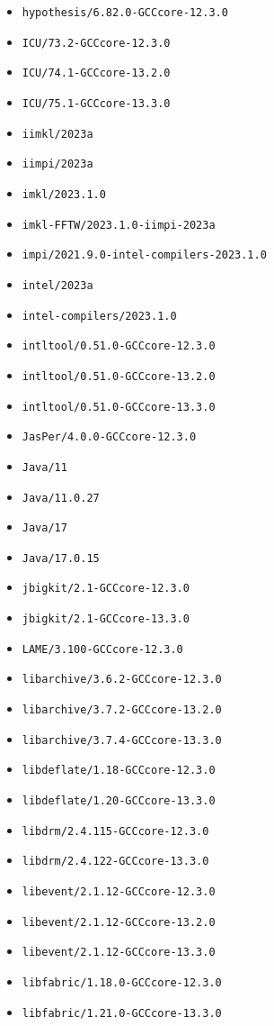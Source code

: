 \begin{multicols}{3}
\begin{itemize}
\item \verb|hypothesis/6.82.0-GCCcore-12.3.0|
\item \verb|ICU/73.2-GCCcore-12.3.0|
\item \verb|ICU/74.1-GCCcore-13.2.0|
\item \verb|ICU/75.1-GCCcore-13.3.0|
\item \verb|iimkl/2023a|
\item \verb|iimpi/2023a|
\item \verb|imkl/2023.1.0|
\item \verb|imkl-FFTW/2023.1.0-iimpi-2023a|
\item \verb|impi/2021.9.0-intel-compilers-2023.1.0|
\item \verb|intel/2023a|
\item \verb|intel-compilers/2023.1.0|
\item \verb|intltool/0.51.0-GCCcore-12.3.0|
\item \verb|intltool/0.51.0-GCCcore-13.2.0|
\item \verb|intltool/0.51.0-GCCcore-13.3.0|
\item \verb|JasPer/4.0.0-GCCcore-12.3.0|
\item \verb|Java/11|
\item \verb|Java/11.0.27|
\item \verb|Java/17|
\item \verb|Java/17.0.15|
\item \verb|jbigkit/2.1-GCCcore-12.3.0|
\item \verb|jbigkit/2.1-GCCcore-13.3.0|
\item \verb|LAME/3.100-GCCcore-12.3.0|
\item \verb|libarchive/3.6.2-GCCcore-12.3.0|
\item \verb|libarchive/3.7.2-GCCcore-13.2.0|
\item \verb|libarchive/3.7.4-GCCcore-13.3.0|
\item \verb|libdeflate/1.18-GCCcore-12.3.0|
\item \verb|libdeflate/1.20-GCCcore-13.3.0|
\item \verb|libdrm/2.4.115-GCCcore-12.3.0|
\item \verb|libdrm/2.4.122-GCCcore-13.3.0|
\item \verb|libevent/2.1.12-GCCcore-12.3.0|
\item \verb|libevent/2.1.12-GCCcore-13.2.0|
\item \verb|libevent/2.1.12-GCCcore-13.3.0|
\item \verb|libfabric/1.18.0-GCCcore-12.3.0|
\item \verb|libfabric/1.21.0-GCCcore-13.3.0|

\end{itemize}
\end{multicols}
